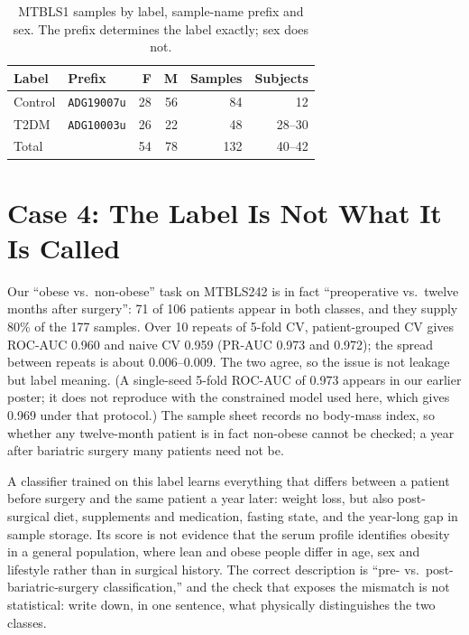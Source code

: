 \documentclass[conference]{IEEEtran}
\newcommand{\verified}[1]{#1}  %
\begin{document}
\begin{table}[t]
\centering
\caption{MTBLS1 samples by label, sample-name prefix and sex. The prefix
determines the label exactly; sex does not.}
\label{tab:case3}
\footnotesize
\begin{tabular}{@{}llrrrr@{}}
\toprule
Label & Prefix & F & M & Samples & Subjects \\
\midrule
Control & \texttt{ADG19007u} & 28 & 56 & 84 & 12 \\
T2DM    & \texttt{ADG10003u} & 26 & 22 & 48 & 28--30 \\
\midrule
Total   &                    & 54 & 78 & 132 & 40--42 \\
\bottomrule
\end{tabular}
\end{table}

\section{Case 4: The Label Is Not What It Is Called}
\label{sec:case4}
Our ``obese vs.\ non-obese'' task on MTBLS242 is in fact ``preoperative vs.\
twelve months after surgery'': \verified{71} of \verified{106} patients
appear in both classes, and they supply \verified{80\%} of the 177 samples.
Over 10 repeats of 5-fold CV, patient-grouped CV gives ROC-AUC
\verified{0.960} and naive CV \verified{0.959} (PR-AUC \verified{0.973} and
\verified{0.972}); the spread between repeats is about \verified{0.006--0.009}.
The two agree, so the issue is not leakage but label meaning. (A single-seed
5-fold ROC-AUC of 0.973 appears in our earlier poster; it does not reproduce
with the constrained model used here, which gives \verified{0.969} under that
protocol.) The sample sheet records no body-mass
index, so whether any twelve-month patient is in fact non-obese cannot be
checked; a year after bariatric surgery many patients need not be.

A classifier trained on this label learns everything that differs between a
patient before surgery and the same patient a year later: weight loss, but
also post-surgical diet, supplements and medication, fasting state, and the
year-long gap in sample storage. Its score is not evidence that the serum
profile identifies obesity in a general population, where lean and obese
people differ in age, sex and lifestyle rather than in surgical history. The
correct description is ``pre- vs.\ post-bariatric-surgery classification,''
and the check that exposes the mismatch is not statistical: write down, in one
sentence, what physically distinguishes the two classes.
\end{document}
